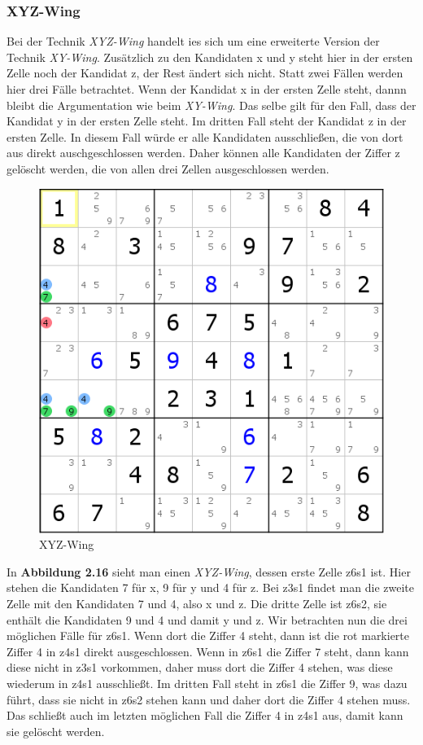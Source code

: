 \newpage
\subsubsection{XYZ-Wing}
Bei der Technik \textit{XYZ-Wing} handelt ies sich um eine erweiterte Version der Technik \textit{XY-Wing}. Zusätzlich zu den Kandidaten x und y steht hier in der ersten Zelle noch der Kandidat z, der Rest ändert sich nicht. Statt zwei Fällen werden hier drei Fälle betrachtet. Wenn der Kandidat x in der ersten Zelle steht, dannn bleibt die Argumentation wie beim \textit{XY-Wing}. Das selbe gilt für den Fall, dass der Kandidat y in der ersten Zelle steht. Im dritten Fall steht der Kandidat z in der ersten Zelle. In diesem Fall würde er alle Kandidaten ausschließen, die von dort aus direkt auschgeschlossen werden. Daher können alle Kandidaten der Ziffer z gelöscht werden, die von allen drei Zellen ausgeschlossen werden.

\begin{figure}[h]
\begin{center}
\includegraphics{./img/XYZ_Wing.png}
\caption{XYZ-Wing}
\end{center}
\end{figure}

In \textbf{Abbildung 2.16} sieht man einen \textit{XYZ-Wing}, dessen erste Zelle z6s1 ist. Hier stehen die Kandidaten 7 für x, 9 für y und 4 für z. Bei z3s1 findet man die zweite Zelle mit den Kandidaten 7 und 4, also x und z. Die dritte Zelle ist z6s2, sie enthält die Kandidaten 9 und 4 und damit y und z. Wir betrachten nun die drei möglichen Fälle für z6s1. Wenn dort die Ziffer 4 steht, dann ist die rot markierte Ziffer 4 in z4s1 direkt ausgeschlossen. Wenn in z6s1 die Ziffer 7 steht, dann kann diese nicht in z3s1 vorkommen, daher muss dort die Ziffer 4 stehen, was diese wiederum in z4s1 ausschließt. Im dritten Fall steht in z6s1 die Ziffer 9, was dazu führt, dass sie nicht in z6s2 stehen kann und daher dort die Ziffer 4 stehen muss. Das schließt auch im letzten möglichen Fall die Ziffer 4 in z4s1 aus, damit kann sie gelöscht werden.